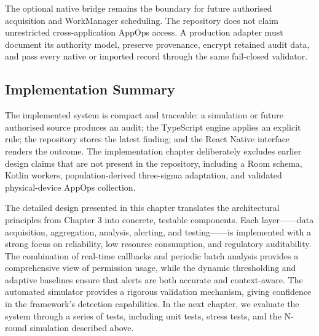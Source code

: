 The optional native bridge remains the boundary for future authorised acquisition and WorkManager scheduling. The repository does not claim unrestricted cross-application AppOps access. A production adapter must document its authority model, preserve provenance, encrypt retained audit data, and pass every native or imported record through the same fail-closed validator.

\subsection{Implementation Summary}

The implemented system is compact and traceable: a simulation or future authorised source produces an audit; the TypeScript engine applies an explicit rule; the repository stores the latest finding; and the React Native interface renders the outcome. The implementation chapter deliberately excludes earlier design claims that are not present in the repository, including a Room schema, Kotlin workers, population-derived three-sigma adaptation, and validated physical-device AppOps collection.

The detailed design presented in this chapter translates the architectural principles from Chapter 3 into concrete, testable components. Each layer——data acquisition, aggregation, analysis, alerting, and testing——is implemented with a strong focus on reliability, low resource consumption, and regulatory auditability. The combination of real-time callbacks and periodic batch analysis provides a comprehensive view of permission usage, while the dynamic thresholding and adaptive baselines ensure that alerts are both accurate and context-aware. The automated simulator provides a rigorous validation mechanism, giving confidence in the framework's detection capabilities. In the next chapter, we evaluate the system through a series of tests, including unit tests, stress tests, and the N-round simulation described above.
